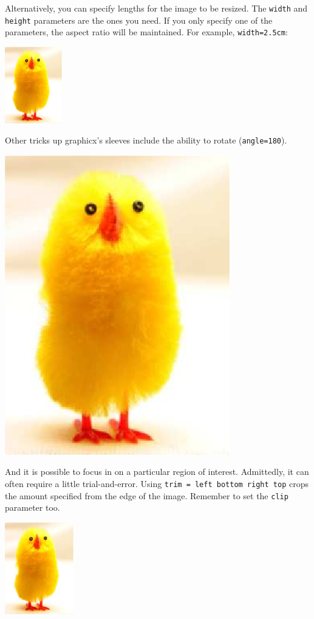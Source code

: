 \documentclass[english]{article}
\begin{document}
Alternatively, you can specify lengths for the image to be resized.  The
\texttt{width} and \texttt{height} parameters are the ones you need.  If
you only specify one of the parameters, the aspect ratio will be
maintained.  For example, \texttt{width=2.5cm}:
\begin{center}
  \includegraphics[width=2.5cm]{chick-img.png}
\end{center}

Other tricks up graphicx's sleeves include the ability to rotate
(\texttt{angle=180}).

\begin{center}
  \includegraphics[scale=0.5, angle=180]{chick-img.png}
\end{center}

And it is possible to focus in on a particular region of interest.
Admittedly, it can often require a little trial-and-error. Using
\texttt{trim = left bottom right top} crops the amount specified from
the edge of the image.  Remember to set the \texttt{clip} parameter too.

\begin{center}
  \includegraphics[trim = 10mm 80mm 20mm 5mm, clip, width=3cm]{chick-img.png}
\end{center}
\end{document}
